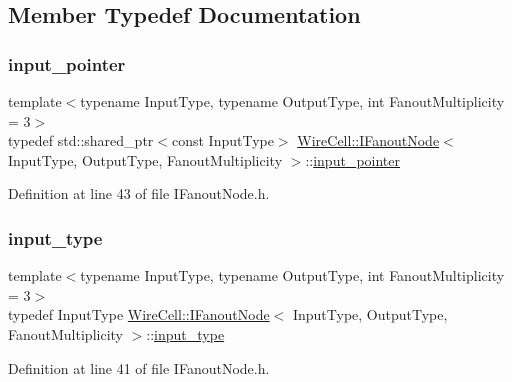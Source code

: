 \subsection{Member Typedef Documentation}
\mbox{\label{class_wire_cell_1_1_i_fanout_node_aefd36d56a531edf1990fe6e263d9c266}} 
\subsubsection{\texorpdfstring{input\+\_\+pointer}{input\_pointer}}
{\footnotesize\ttfamily template$<$typename Input\+Type, typename Output\+Type, int Fanout\+Multiplicity = 3$>$ \\
typedef std\+::shared\+\_\+ptr$<$const Input\+Type$>$ \hyperlink{class_wire_cell_1_1_i_fanout_node}{Wire\+Cell\+::\+I\+Fanout\+Node}$<$ Input\+Type, Output\+Type, Fanout\+Multiplicity $>$\+::\hyperlink{class_wire_cell_1_1_i_fanout_node_aefd36d56a531edf1990fe6e263d9c266}{input\+\_\+pointer}}



Definition at line 43 of file I\+Fanout\+Node.\+h.

\mbox{\label{class_wire_cell_1_1_i_fanout_node_a4d7d57d210a8918c1495df2c700e61e8}} 
\subsubsection{\texorpdfstring{input\+\_\+type}{input\_type}}
{\footnotesize\ttfamily template$<$typename Input\+Type, typename Output\+Type, int Fanout\+Multiplicity = 3$>$ \\
typedef Input\+Type \hyperlink{class_wire_cell_1_1_i_fanout_node}{Wire\+Cell\+::\+I\+Fanout\+Node}$<$ Input\+Type, Output\+Type, Fanout\+Multiplicity $>$\+::\hyperlink{class_wire_cell_1_1_i_fanout_node_a4d7d57d210a8918c1495df2c700e61e8}{input\+\_\+type}}



Definition at line 41 of file I\+Fanout\+Node.\+h.

